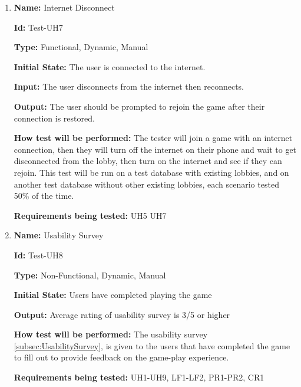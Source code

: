 \documentclass[12pt, titlepage]{article}
\begin{document}
\begin{enumerate}
					


\item{\textbf{Name: }Internet Disconnect } \label{itm:Test-UH8}

\textbf{Id:} Test-UH7

\textbf{Type:} Functional, Dynamic, Manual
					
\textbf{Initial State:} The user is connected to the internet.
					
\textbf{Input:} The user disconnects from the internet then reconnects.
					
\textbf{Output:} The user should be prompted to rejoin the game after their connection is restored.
					
\textbf{How test will be performed:} The tester will join a game with an internet connection, then they will turn off the internet on their phone and wait to get disconnected from the lobby, then turn on the internet and see if they can rejoin. This test will be run on a test database with existing lobbies, and on another test database without other existing lobbies, each scenario tested 50\% of the time.

\textbf{Requirements being tested:} UH5 UH7

\item{\textbf{Name: }Usability Survey } \label{itm:Test-UH9}

\textbf{Id:} Test-UH8

\textbf{Type:} Non-Functional, Dynamic, Manual
					
\textbf{Initial State:} Users have completed playing the game

\textbf{Output:} Average rating of usability survey is 3/5 or higher

\textbf{How test will be performed:}  The usability survey \ref{subsec:UsabilitySurvey}, is given to the users that have completed the game to fill out to provide feedback on the game-play experience.

\textbf{Requirements being tested:} UH1-UH9, LF1-LF2, PR1-PR2, CR1

\end{enumerate}
\end{document}
